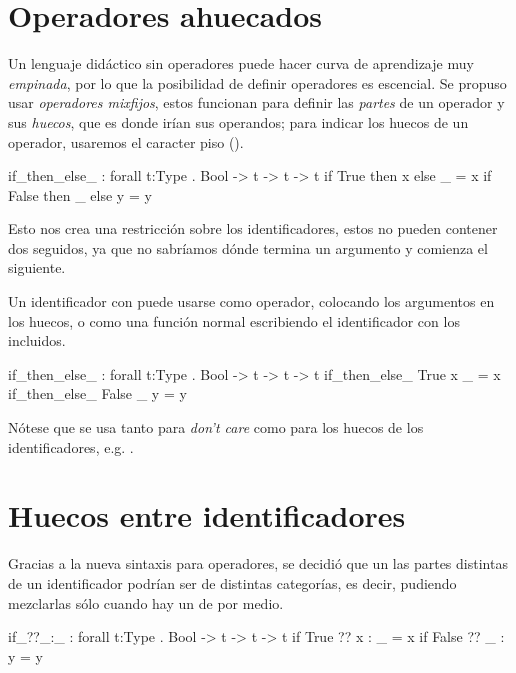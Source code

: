 {\section{Operadores ahuecados}

\begin{designfr}
Un lenguaje didáctico sin operadores puede hacer curva de aprendizaje muy \emph{empinada}, por lo que la posibilidad de definir operadores es escencial. Se propuso usar \emph{operadores mixfijos}, estos funcionan para definir las \emph{partes} de un operador y sus \emph{huecos}, que es donde irían sus operandos; para indicar los huecos de un operador, usaremos el caracter piso (\inlinecode{\_}).

\begin{anglercode}
if_then_else_ : forall t:Type . Bool -> t -> t -> t
if True  then x else _ = x
if False then _ else y = y
\end{anglercode}

Esto nos crea una restricción sobre los identificadores, estos no pueden contener dos \inlinecode{\_} seguidos, ya que no sabríamos dónde termina un argumento y comienza el siguiente.

Un identificador con \inlinecode{\_} puede usarse como operador, colocando los argumentos en los huecos, o como una función normal escribiendo el identificador con los \inlinecode{\_} incluidos.

\begin{anglercode}
if_then_else_ : forall t:Type . Bool -> t -> t -> t
if_then_else_ True  x _ = x
if_then_else_ False _ y = y
\end{anglercode}

Nótese que se usa \inlinecode{\_} tanto para \emph{don't care} como para los huecos de los identificadores, e.g. .
\end{designfr}

\section{Huecos entre identificadores}

\begin{designfr}
Gracias a la nueva sintaxis para operadores, se decidió que un las partes distintas de un identificador podrían ser de distintas categorías, es decir, pudiendo mezclarlas sólo cuando hay un \inlinecode{\_} de por medio.

\begin{anglercode}
if_??_:_ : forall t:Type . Bool -> t -> t -> t
if True  ?? x : _ = x
if False ?? _ : y = y
\end{anglercode}
\end{designfr}

}
